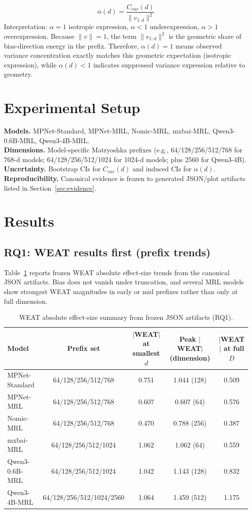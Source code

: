 \documentclass[conference]{IEEEtran}
\begin{document}
\begin{equation}
\alpha(d)=\frac{C_{var}(d)}{\|v_{1:d}\|^2}
\end{equation}
Interpretation: $\alpha=1$ isotropic expression, $\alpha<1$ underexpression, $\alpha>1$ overexpression.
Because $\|v\|=1$, the term $\|v_{1:d}\|^2$ is the geometric share of bias-direction energy in the prefix. Therefore, $\alpha(d)=1$ means observed variance concentration exactly matches this geometric expectation (isotropic expression), while $\alpha(d)<1$ indicates suppressed variance expression relative to geometry.

\section{Experimental Setup}
\textbf{Models.} MPNet-Standard, MPNet-MRL, Nomic-MRL, mxbai-MRL, Qwen3-0.6B-MRL, Qwen3-4B-MRL.\\
\textbf{Dimensions.} Model-specific Matryoshka prefixes (e.g., 64/128/256/512/768 for 768-d models; 64/128/256/512/1024 for 1024-d models; plus 2560 for Qwen3-4B).\\
\textbf{Uncertainty.} Bootstrap CIs for $C_{var}(d)$ and induced CIs for $\alpha(d)$.\\
\textbf{Reproducibility.} Canonical evidence is frozen to generated JSON/plot artifacts listed in Section~\ref{sec:evidence}.

\section{Results}
\subsection{RQ1: WEAT results first (prefix trends)}
Table~\ref{tab:weat-summary} reports frozen WEAT absolute effect-size trends from the canonical JSON artifacts. Bias does not vanish under truncation, and several MRL models show strongest WEAT magnitudes in early or mid prefixes rather than only at full dimension.

\begin{table}[t]
\caption{WEAT absolute effect-size summary from frozen JSON artifacts (RQ1).}
\label{tab:weat-summary}
\centering
\begin{tabular}{lcccc}
\toprule
Model & Prefix set & $|$WEAT$|$ at smallest $d$ & Peak $|$WEAT$|$ (dimension) & $|$WEAT$|$ at full $D$ \\
\midrule
MPNet-Standard & 64/128/256/512/768 & 0.751 & 1.044 (128) & 0.509 \\
MPNet-MRL & 64/128/256/512/768 & 0.607 & 0.607 (64) & 0.576 \\
Nomic-MRL & 64/128/256/512/768 & 0.470 & 0.788 (256) & 0.387 \\
mxbai-MRL & 64/128/256/512/1024 & 1.062 & 1.062 (64) & 0.559 \\
Qwen3-0.6B-MRL & 64/128/256/512/1024 & 1.042 & 1.143 (128) & 0.832 \\
Qwen3-4B-MRL & 64/128/256/512/1024/2560 & 1.064 & 1.459 (512) & 1.175 \\
\bottomrule
\end{tabular}
\end{table}
\end{document}
